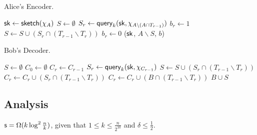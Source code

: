 \begin{algorithm}[H] 
  \caption{Alice's Encoder.} \label{algo:enc4}
  \begin{algorithmic}[1]
    \State $\mathsf{sk} \leftarrow \mathsf{sketch}(\chi_A)$
    \State $S\leftarrow \emptyset$
    \State $S_r\leftarrow \mathsf{query}_k(\mathsf{sk}, \chi_{A\backslash (A\cap T_{r-1})})$
     
      \State $b_r\leftarrow 1$ 
      \State $S\leftarrow S \cup (S_r\cap (T_{r-1}\backslash T_r))$
    \Else 
      \State $b_r\leftarrow 0$
    \EndIf
    \EndFor
      \State \Return ($\mathsf{sk}$, $A\backslash S$, $b$) 
    \EndProcedure
  \end{algorithmic}
\end{algorithm}

\begin{algorithm}[H] 
  \caption{Bob's Decoder.} \label{algo:dec4}
  \begin{algorithmic}[1]
    \State $S\leftarrow \emptyset$
    \State $C_0 \leftarrow \emptyset$
      \State $C_r\leftarrow C_{r-1}$
        \State $S_r\leftarrow \mathsf{query}_k(\mathsf{sk}, \chi_{C_{r-1}})$ 
        \State $S\leftarrow S \cup (S_r\cap (T_{r-1}\backslash T_r))$
        \State $C_r\leftarrow C_r \cup (S_r\cap (T_{r-1}\backslash T_r))$
      \EndIf
      \State $C_r\leftarrow C_r \cup (B\cap (T_{r-1}\backslash T_r))$
    \EndFor
    \State \Return $B\cup S$ 
    \EndProcedure
  \end{algorithmic}
\end{algorithm}

\subsection{Analysis}

\begin{theorem}
  $\textsf{s} = \Omega(k\log^2 \frac{n}{k} )$, given that $1 \le k \le \frac{n}{2^{10}}$ and $\delta \le \frac{1}{2}$.
\end{theorem}

